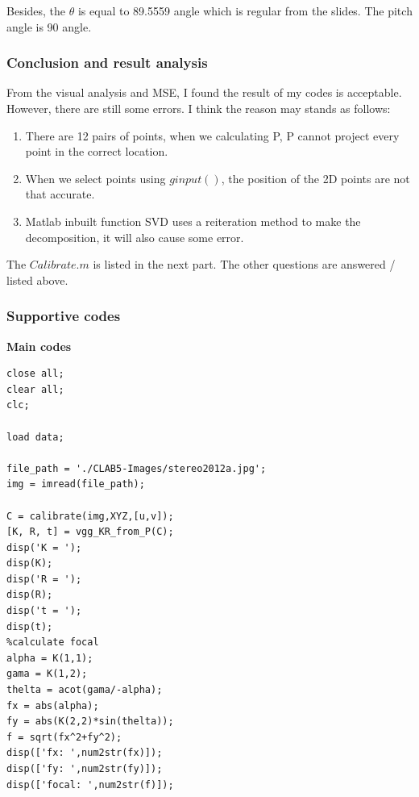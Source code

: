 \documentclass{article}
\begin{document}
Besides, the $\theta$ is equal to 89.5559 angle which is regular from the slides. The pitch angle is 90 angle.

\subsubsection*{Conclusion and result analysis}

From the visual analysis and MSE, I found the result of my codes is acceptable. However, there are still some errors. I think the reason may stands as follows:

\begin{enumerate}
    \item There are 12 pairs of points, when we calculating P, P cannot project every point in the correct location.
    \item When we select points using $ginput()$, the position of the 2D points are not that accurate.
    \item Matlab inbuilt function SVD uses a reiteration method to make the decomposition, it will also cause some error.
\end{enumerate}

The $Calibrate.m$ is listed in the next part. The other questions are answered / listed above.


\subsubsection*{Supportive codes}
\textbf{Main codes}
\begin{lstlisting}
close all;
clear all;
clc;

load data;

file_path = './CLAB5-Images/stereo2012a.jpg';
img = imread(file_path);

C = calibrate(img,XYZ,[u,v]);
[K, R, t] = vgg_KR_from_P(C);
disp('K = ');
disp(K);
disp('R = ');
disp(R);
disp('t = ');
disp(t);
%calculate focal
alpha = K(1,1);
gama = K(1,2);
thelta = acot(gama/-alpha);
fx = abs(alpha);
fy = abs(K(2,2)*sin(thelta));
f = sqrt(fx^2+fy^2);
disp(['fx: ',num2str(fx)]);
disp(['fy: ',num2str(fy)]);
disp(['focal: ',num2str(f)]);

\end{lstlisting}
\end{document}
